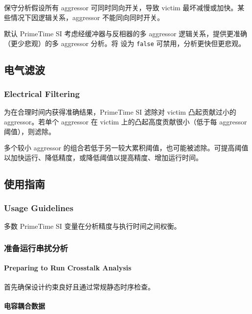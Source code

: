 保守分析假设所有 aggressor 可同时同向开关，导致 victim 最坏减慢或加快。某些情况下因逻辑关系，aggressor 不能同向同时开关。


默认 PrimeTime SI 考虑经缓冲器与反相器的多 aggressor 逻辑关系，提供更准确（更少悲观）的多 aggressor 分析。将  设为 \texttt{false} 可禁用，分析更快但更悲观。

\subsection{电气滤波}
\subsubsection*{Electrical Filtering}

为在合理时间内获得准确结果，PrimeTime SI 滤除对 victim 凸起贡献过小的 aggressor。若单个 aggressor 在 victim 上的凸起高度贡献很小（低于每 aggressor 阈值），则滤除。


多个较小 aggressor 的组合若低于另一较大累积阈值，也可能被滤除。可提高阈值以加快运行、降低精度，或降低阈值以提高精度、增加运行时间。

\subsection{使用指南}
\subsubsection*{Usage Guidelines}

多数 PrimeTime SI 变量在分析精度与执行时间之间权衡。

\subsubsection{准备运行串扰分析}
\paragraph*{Preparing to Run Crosstalk Analysis}

首先确保设计约束良好且通过常规静态时序检查。

\paragraph*{电容耦合数据}

